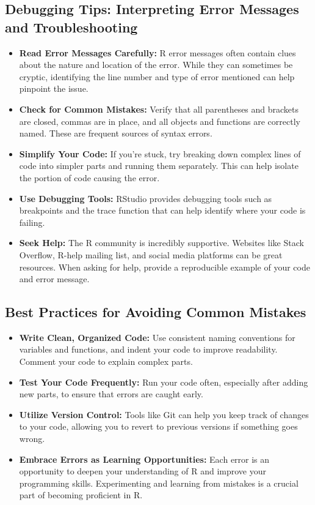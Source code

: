 \documentclass[
]{book}
\begin{document}
\hypertarget{debugging-tips-interpreting-error-messages-and-troubleshooting}{%
\subsection{Debugging Tips: Interpreting Error Messages and Troubleshooting}\label{debugging-tips-interpreting-error-messages-and-troubleshooting}}

\begin{itemize}
\item
  \textbf{Read Error Messages Carefully:} R error messages often contain clues about the nature and location of the error. While they can sometimes be cryptic, identifying the line number and type of error mentioned can help pinpoint the issue.
\item
  \textbf{Check for Common Mistakes:} Verify that all parentheses and brackets are closed, commas are in place, and all objects and functions are correctly named. These are frequent sources of syntax errors.
\item
  \textbf{Simplify Your Code:} If you're stuck, try breaking down complex lines of code into simpler parts and running them separately. This can help isolate the portion of code causing the error.
\item
  \textbf{Use Debugging Tools:} RStudio provides debugging tools such as breakpoints and the trace function that can help identify where your code is failing.
\item
  \textbf{Seek Help:} The R community is incredibly supportive. Websites like Stack Overflow, R-help mailing list, and social media platforms can be great resources. When asking for help, provide a reproducible example of your code and error message.
\end{itemize}

\hypertarget{best-practices-for-avoiding-common-mistakes}{%
\subsection*{Best Practices for Avoiding Common Mistakes}\label{best-practices-for-avoiding-common-mistakes}}

\begin{itemize}
\item
  \textbf{Write Clean, Organized Code:} Use consistent naming conventions for variables and functions, and indent your code to improve readability. Comment your code to explain complex parts.
\item
  \textbf{Test Your Code Frequently:} Run your code often, especially after adding new parts, to ensure that errors are caught early.
\item
  \textbf{Utilize Version Control:} Tools like Git can help you keep track of changes to your code, allowing you to revert to previous versions if something goes wrong.
\item
  \textbf{Embrace Errors as Learning Opportunities:} Each error is an opportunity to deepen your understanding of R and improve your programming skills. Experimenting and learning from mistakes is a crucial part of becoming proficient in R.
\end{itemize}
\end{document}
